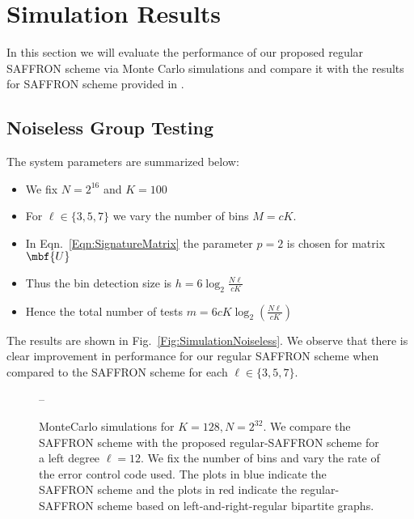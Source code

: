 \documentclass[conference,twocolumn]{IEEEtran}
\newcommand*{\FigPath}{../Figures}
\begin{document}
\section{Simulation Results}
In this section we will evaluate the performance of our proposed regular SAFFRON scheme via Monte Carlo simulations and compare it with the results for SAFFRON scheme provided in \cite{lee2015saffron}.
\subsection*{Noiseless Group Testing}
The system parameters are summarized below:
\begin{itemize}
\item We fix $N=2^{16}$ and $K=100$
\item For $\ell\in\{3,5,7\}$ we vary the number of bins $M=c K$.
\item In Eqn.~\ref{Eqn:SignatureMatrix} the parameter $p=2$ is chosen for matrix $\mbf{U}$
\item Thus the bin detection size is $h=6\log_2 \frac{N\ell}{cK}$
\item Hence the total number of tests $m=6cK\log_2 \left(\frac{N\ell}{cK}\right)$
\end{itemize}
The results are shown in Fig.~\ref{Fig:SimulationNoiseless}. We observe that there is clear improvement in performance for our regular SAFFRON scheme when compared to the SAFFRON scheme for each $\ell\in\{3,5,7\}$.

\begin{figure}[t!]
\centering

\caption{MonteCarlo simulations for $K=128, N=2^{32}$. We compare the SAFFRON scheme with the proposed regular-SAFFRON scheme for a left degree $\ell=12$. We fix the number of bins and vary the rate of the error control code used. The plots in blue indicate the SAFFRON scheme\cite{lee2015saffron} and the plots in red indicate the regular-SAFFRON scheme based on left-and-right-regular bipartite graphs.}
--\label{Fig:SimulationNoisy}
\end{figure}
\end{document}
